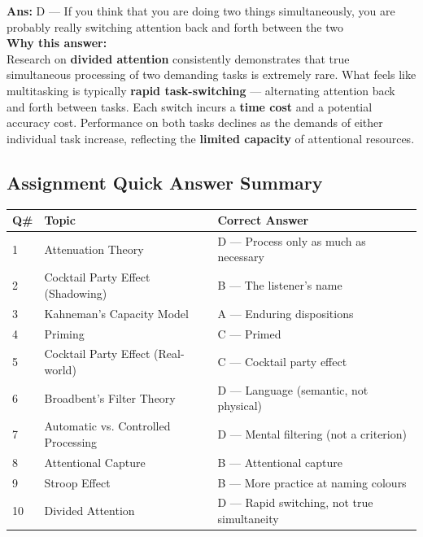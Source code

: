 \documentclass[11pt,a4paper]{article}
\newcommand{\bb}[1]{\textbf{#1}}
\begin{document}
\vspace{0.3cm}
\noindent\textbf{Ans:} D — If you think that you are doing two things simultaneously, you are probably really switching attention back and forth between the two\\[0.2cm]
\textbf{Why this answer:} \\
Research on \textbf{divided attention} consistently demonstrates that true simultaneous processing of two demanding tasks is extremely rare. What feels like multitasking is typically \textbf{rapid task-switching} — alternating attention back and forth between tasks. Each switch incurs a \textbf{time cost} and a potential accuracy cost. Performance on both tasks declines as the demands of either individual task increase, reflecting the \textbf{limited capacity} of attentional resources.
\vspace{0.4cm}

\medskip
\subsection*{Assignment Quick Answer Summary}

\begin{center}
\renewcommand{\arraystretch}{1.4}
\begin{tabular}{|L{0.8cm}|L{6.2cm}|L{8.2cm}|}
\hline
\bb{Q\#} & \bb{Topic} & \bb{Correct Answer} \\
 & Attenuation Theory & D — Process only as much as necessary \\
2 & Cocktail Party Effect (Shadowing) & B — The listener's name \\
3 & Kahneman's Capacity Model & A — Enduring dispositions \\
4 & Priming & C — Primed \\
5 & Cocktail Party Effect (Real-world) & C — Cocktail party effect \\
6 & Broadbent's Filter Theory & D — Language (semantic, not physical) \\
7 & Automatic vs. Controlled Processing & D — Mental filtering (not a criterion) \\
8 & Attentional Capture & B — Attentional capture \\
9 & Stroop Effect & B — More practice at naming colours \\
10 & Divided Attention & D — Rapid switching, not true simultaneity \\
\hline
\end{tabular}
\end{center}

\medskip
\end{document}
